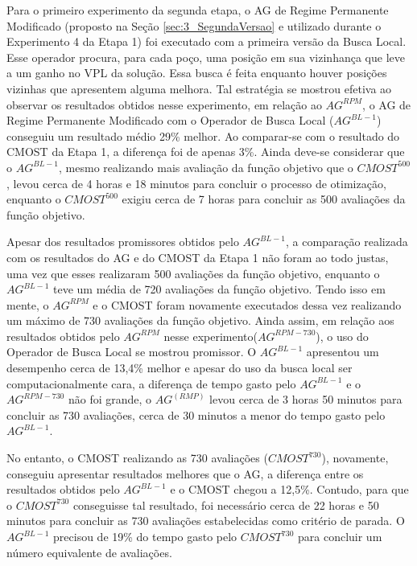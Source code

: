 Para o primeiro experimento da segunda etapa, o AG de Regime Permanente Modificado (proposto na Seção \ref{sec:3_SegundaVersao} e utilizado durante o Experimento 4 da Etapa 1) foi executado com a primeira versão da Busca Local. Esse operador procura, para cada poço, uma posição em sua vizinhança que leve a um ganho no VPL da solução. Essa busca é feita enquanto houver posições vizinhas que apresentem alguma melhora. Tal estratégia se mostrou efetiva ao observar os resultados obtidos nesse experimento, em relação ao $AG^{RPM}$, o AG de Regime Permanente Modificado com o Operador de Busca Local ($AG^{BL-1}$) conseguiu um resultado médio 29\% melhor. Ao comparar-se com o resultado do CMOST da Etapa 1, a diferença foi de apenas 3\%. Ainda deve-se considerar que o $AG^{BL-1}$, mesmo realizando mais avaliação da função objetivo que o $CMOST^{500}$, levou cerca de 4 horas e 18 minutos para concluir o processo de otimização, enquanto o $CMOST^{500}$ exigiu cerca de 7 horas para concluir as 500 avaliações da função objetivo.

Apesar dos resultados promissores obtidos pelo $AG^{BL-1}$, a comparação realizada com os resultados do AG e do CMOST da Etapa 1 não foram ao todo justas, uma vez que esses realizaram 500 avaliações da função objetivo, enquanto o $AG^{BL-1}$ teve um média de 720 avaliações da função objetivo. Tendo isso em mente, o $AG^{RPM}$ e o CMOST foram novamente executados dessa vez realizando um máximo de 730 avaliações da função objetivo. Ainda assim, em relação aos resultados obtidos pelo $AG^{RPM}$ nesse experimento($AG^{RPM-730}$), o uso do Operador de Busca Local se mostrou promissor. O $AG^{BL-1}$ apresentou um desempenho cerca de 13,4\% melhor e apesar do uso da busca local ser computacionalmente cara, a diferença de tempo gasto pelo $AG^{BL-1}$ e o $AG^{RPM-730}$ não foi grande, o $AG^(RMP)$ levou cerca de 3 horas 50 minutos para concluir as 730 avaliações, cerca de 30 minutos a menor do tempo gasto pelo $AG^{BL-1}$.

No entanto, o CMOST realizando as 730 avaliações ($CMOST^{730}$), novamente, conseguiu apresentar resultados melhores que o AG, a diferença entre os resultados obtidos pelo $AG^{BL-1}$ e o CMOST chegou a 12,5\%. Contudo, para que o $CMOST^{730}$ conseguisse tal resultado, foi necessário cerca de 22 horas e 50 minutos para concluir as 730 avaliações estabelecidas como critério de parada. O $AG^{BL-1}$ precisou de 19\% do tempo gasto pelo $CMOST^{730}$ para concluir um número equivalente de avaliações.

